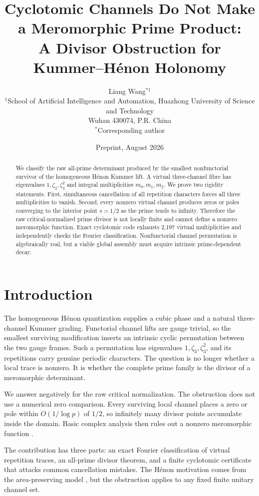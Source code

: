 \documentclass[11pt]{article}
\title{Cyclotomic Channels Do Not Make a Meromorphic Prime Product:\\
A Divisor Obstruction for Kummer--H\'enon Holonomy}
\author{Liang Wang$^{*1}$\\
\small $^{1}$School of Artificial Intelligence and Automation, Huazhong University of Science and Technology\\
\small Wuhan 430074, P.R. China\\
\small $^*$Corresponding author}
\date{Preprint, August 2026}
\theoremstyle{remark}\newtheorem{remark}[theorem]{Remark}
\begin{document}
\maketitle
\begin{abstract}
We classify the raw all-prime determinant produced by the smallest
nonfunctorial survivor of the homogeneous H\'enon Kummer lift.  A virtual
three-channel fibre has eigenvalues \(1,\zeta_3,\zeta_3^2\) and integral
multiplicities \(m_0,m_1,m_2\).  We prove two rigidity statements.  First,
simultaneous cancellation of all repetition characters forces all three
multiplicities to vanish.  Second, every nonzero virtual channel produces
zeros or poles converging to the interior point \(s=1/2\) as the prime tends
to infinity.  Therefore the raw critical-normalized prime divisor is not
locally finite and cannot define a nonzero meromorphic function.  Exact
cyclotomic code exhausts 2,197 virtual multiplicities and independently
checks the Fourier classification.  Nonfunctorial channel permutation is
algebraically real, but a viable global assembly must acquire intrinsic
prime-dependent decay.
\end{abstract}

\section{Introduction}
The homogeneous H\'enon quantization supplies a cubic phase and a natural
three-channel Kummer grading.  Functorial channel lifts are gauge trivial,
so the smallest surviving modification inserts an intrinsic cyclic
permutation between the two gauge frames.  Such a permutation has
eigenvalues \(1,\zeta_3,\zeta_3^2\), and its repetitions carry genuine
periodic characters.  The question is no longer whether a local trace is
nonzero.  It is whether the complete prime family is the divisor of a
meromorphic determinant.

We answer negatively for the raw critical normalization.  The obstruction
does not use a numerical zero comparison.  Every surviving local channel
places a zero or pole within \(O(1/\log p)\) of \(1/2\), so infinitely many
divisor points accumulate inside the domain.  Basic complex analysis then
rules out a nonzero meromorphic function \cite{Conway1978}.

The contribution has three parts: an exact Fourier classification of
virtual repetition traces, an all-prime divisor theorem, and a finite
cyclotomic certificate that attacks common cancellation mistakes.  The
H\'enon motivation comes from the area-preserving model \cite{Wang2026}, but
the obstruction applies to any fixed finite unitary channel set.
\end{document}
